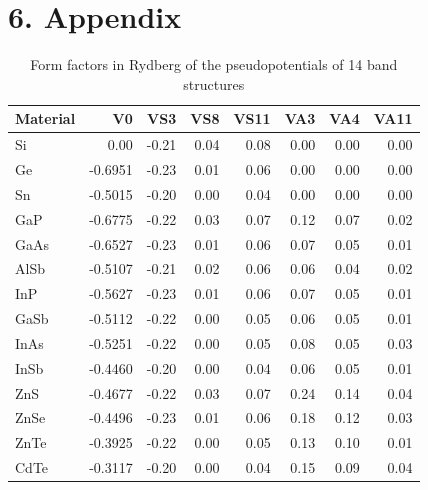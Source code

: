 \documentclass[twocolumn]{article}[h]
\begin{document}
\section*{6. Appendix}
\begin{table}[h]
    \centering
    \small
    \setlength{\tabcolsep}{4pt}
    \begin{tabular}{lrrrrrrr}
    \toprule
    Material & V0      & VS3   & VS8   & VS11  & VA3   & VA4   & VA11  \\
    \midrule
    Si       & 0.00    & -0.21 & 0.04  & 0.08  & 0.00  & 0.00  & 0.00  \\
    Ge       & -0.6951 & -0.23 & 0.01  & 0.06  & 0.00  & 0.00  & 0.00  \\
    Sn       & -0.5015 & -0.20 & 0.00  & 0.04  & 0.00  & 0.00  & 0.00  \\
    GaP      & -0.6775 & -0.22 & 0.03  & 0.07  & 0.12  & 0.07  & 0.02  \\
    GaAs     & -0.6527 & -0.23 & 0.01  & 0.06  & 0.07  & 0.05  & 0.01  \\
    AlSb     & -0.5107 & -0.21 & 0.02  & 0.06  & 0.06  & 0.04  & 0.02  \\
    InP      & -0.5627 & -0.23 & 0.01  & 0.06  & 0.07  & 0.05  & 0.01  \\
    GaSb     & -0.5112 & -0.22 & 0.00  & 0.05  & 0.06  & 0.05  & 0.01  \\
    InAs     & -0.5251 & -0.22 & 0.00  & 0.05  & 0.08  & 0.05  & 0.03  \\
    InSb     & -0.4460 & -0.20 & 0.00  & 0.04  & 0.06  & 0.05  & 0.01  \\
    ZnS      & -0.4677 & -0.22 & 0.03  & 0.07  & 0.24  & 0.14  & 0.04  \\
    ZnSe     & -0.4496 & -0.23 & 0.01  & 0.06  & 0.18  & 0.12  & 0.03  \\
    ZnTe     & -0.3925 & -0.22 & 0.00  & 0.05  & 0.13  & 0.10  & 0.01  \\
    CdTe     & -0.3117 & -0.20 & 0.00  & 0.04  & 0.15  & 0.09  & 0.04  \\
    \bottomrule
    \end{tabular}
    \caption{Form factors in Rydberg of the pseudopotentials of 14 band structures}
    \label{tab:semiconductors}
\end{table}
\end{document}
